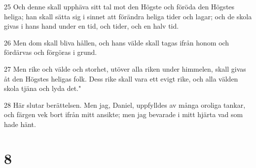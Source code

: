 \par 25 Och denne skall upphäva sitt tal mot den Högste och föröda den Högstes heliga; han skall sätta sig i sinnet att förändra heliga tider och lagar; och de skola givas i hans hand under en tid, och tider, och en halv tid.
\par 26 Men dom skall bliva hållen, och hans välde skall tagas ifrån honom och fördärvas och förgöras i grund.
\par 27 Men rike och välde och storhet, utöver alla riken under himmelen, skall givas åt den Högstes heligas folk. Dess rike skall vara ett evigt rike, och alla välden skola tjäna och lyda det."
\par 28 Här slutar berättelsen. Men jag, Daniel, uppfylldes av många oroliga tankar, och färgen vek bort ifrån mitt ansikte; men jag bevarade i mitt hjärta vad som hade hänt.

\chapter{8}

